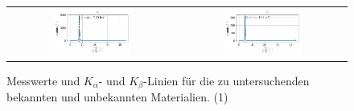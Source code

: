 \documentclass[ngerman]{scrartcl}
\begin{document}
\begin{figure}[H]
\begin{tabular}{cc}
      \includegraphics[width=0.48\textwidth]{../plots/roentgen_data_5.pdf} &
      \includegraphics[width=0.48\textwidth]{../plots/roentgen_data_6.pdf} \\
    \end{tabular}
    \caption{Messwerte und $K_{\alpha}$- und $K_{\beta}$-Linien für die zu untersuchenden bekannten und unbekannten Materialien. (1)}
    \label{fig:roentgenfloureszenz1}
  \end{figure}
\end{document}
